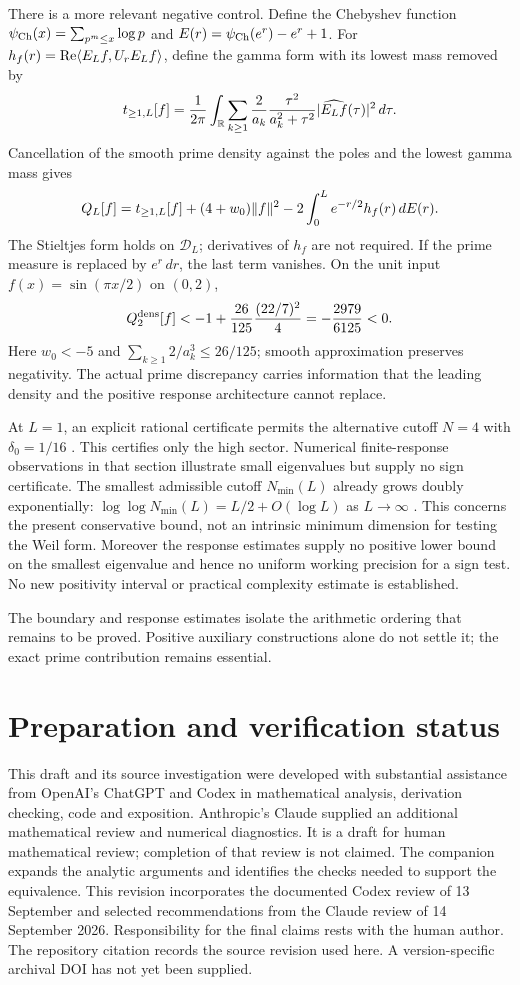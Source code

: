 There is a more relevant negative control. Define the Chebyshev function
$\psi_{\rm Ch}(x)=\sum_{p^m\le x}\log p$ and
$E(r)=\psi_{\rm Ch}(e^r)-e^r+1$. For
$h_f(r)=\operatorname{Re}\langle E_Lf,U_rE_Lf\rangle$, define the gamma form with its lowest
mass removed by
\[
t_{\ge1,L}[f]=\frac1{2\pi}\int_\mathbb R
\sum_{k\ge1}\frac2{a_k}\frac{\tau^2}{a_k^2+\tau^2}
|\widehat{E_Lf}(\tau)|^2\,d\tau.
\]
Cancellation of the smooth prime density against the poles and the
lowest gamma mass gives
\begin{equation}\label{eq:discrepancy}
Q_L[f]=t_{\ge1,L}[f]+(4+w_0)\lVert f\rVert^2
-2\int_0^L e^{-r/2}h_f(r)\,dE(r).
\end{equation}
The Stieltjes form holds on $\mathcal D_L$; derivatives of $h_f$ are not
required. If the prime measure is replaced by $e^r\,dr$, the last term
vanishes. On the unit input $f(x)=\sin(\pi x/2)$ on $(0,2)$,
\[
Q_2^{\rm dens}[f]<-1+\frac{26}{125}\frac{(22/7)^2}{4}
=-\frac{2979}{6125}<0.
\]
Here $w_0<-5$ and
$\sum_{k\ge1}2/a_k^3\le26/125$; smooth approximation preserves negativity.
The actual prime discrepancy carries information that the leading density
and the positive response architecture cannot replace.

At $L=1$, an explicit rational certificate permits the alternative cutoff
$N=4$ with $\delta_0=1/16$ \cite[Section 13]{Companion}.
This certifies only the high sector. Numerical finite-response observations
in that section illustrate small eigenvalues but supply no sign certificate.
The smallest admissible cutoff $N_{\min}(L)$ already grows doubly
exponentially: $\log\log N_{\min}(L)=L/2+O(\log L)$ as $L\to\infty$
\cite[Section 4]{Companion}. This concerns the present conservative bound,
not an intrinsic minimum dimension for testing the Weil form.
Moreover the response estimates supply no positive lower bound on the
smallest eigenvalue and hence no uniform working precision for a sign test.
No new positivity interval or practical complexity estimate is established.

The boundary and response estimates isolate the arithmetic ordering that
remains to be proved. Positive auxiliary constructions alone do not settle
it; the exact prime contribution remains essential.

\section*{Preparation and verification status}
This draft and its source investigation were developed with substantial
assistance from OpenAI's ChatGPT and Codex in mathematical analysis,
derivation checking, code and exposition. Anthropic's Claude supplied an
additional mathematical review and numerical diagnostics. It is a draft
for human mathematical review; completion of that review is not claimed.
The companion \cite{Companion} expands the analytic arguments and identifies
the checks needed to support the equivalence. This revision incorporates
the documented Codex review of 13 September and selected recommendations
from the Claude review of 14 September 2026. Responsibility for the final
claims rests with the human author. The repository citation records the source
revision used here. A version-specific archival DOI has not yet been supplied.



